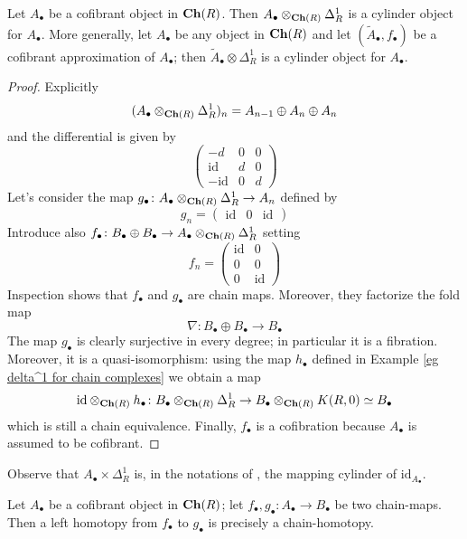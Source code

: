 \begin{refsection}
\begin{lemma}
Let $A_\bullet$ be a cofibrant object in $\mathbf{Ch}(R)$. Then $A_\bullet \otimes_{\mathbf{Ch}(R)} \Delta^1_R$ is a cylinder object for $A_\bullet$. More generally, let $A_\bullet$ be any object in $\mathbf{Ch}(R)$ and let $(\widetilde{A}_\bullet,f_\bullet)$ be a cofibrant approximation of $A_\bullet$; then $\widetilde{A}_\bullet \otimes \Delta^1_R$ is a cylinder object for $A_\bullet$.
\end{lemma}

\begin{proof}
Explicitly
\[
(A_\bullet \otimes_{\mathbf{Ch}(R)} \Delta^1_R)_n = A_{n-1} \oplus A_n \oplus A_n
\]
and the differential is given by
\[
\begin{pmatrix}
- d & 0 & 0 \\ \mathrm{id} & d & 0 \\ - \mathrm{id} & 0 & d
\end{pmatrix}
\]
Let's consider the map $g_\bullet \colon A_\bullet \otimes_{\mathbf{Ch}(R)} \Delta^1_R \to A_n$ defined by
\[
g_n = \begin{pmatrix} \mathrm{id} & 0 & \mathrm{id} \end{pmatrix}
\]
Introduce also $f_\bullet \colon B_\bullet \oplus B_\bullet \to A_\bullet \otimes_{\mathbf{Ch}(R)} \Delta^1_R$ setting
\[
f_n = \begin{pmatrix} \mathrm{id} & 0 \\ 0 & 0 \\ 0 & \mathrm{id} \end{pmatrix}
\]
Inspection shows that $f_\bullet$ and $g_\bullet$ are chain maps. Moreover, they factorize the fold map
\[
\nabla \colon B_\bullet \oplus B_\bullet \to B_\bullet
\]
The map $g_\bullet$ is clearly surjective in every degree; in particular it is a fibration. Moreover, it is a quasi-isomorphism: using the map $h_\bullet$ defined in Example \ref{eg delta^1 for chain complexes} we obtain a map
\[
\mathrm{id} \otimes_{\mathbf{Ch}(R)} h_\bullet \colon B_\bullet \otimes_{\mathbf{Ch}(R)} \Delta^1_R \to B_\bullet \otimes_{\mathbf{Ch}(R)} K(R,0) \simeq B_\bullet
\]
which is still a chain equivalence. Finally, $f_\bullet$ is a cofibration because $A_\bullet$ is assumed to be cofibrant.
\end{proof}

\begin{rmk}
Observe that $A_\bullet \times \Delta^1_R$ is, in the notations of \cite[Ch. 1.5]{weibel}, the mapping cylinder of $\mathrm{id}_{A_\bullet}$.
\end{rmk}

\begin{cor}
Let $A_\bullet$ be a cofibrant object in $\mathbf{Ch}(R)$; let $f_\bullet, g_\bullet \colon A_\bullet \to B_\bullet$ be two chain-maps. Then a left homotopy from $f_\bullet$ to $g_\bullet$ is precisely a chain-homotopy.
\end{cor}


\end{refsection}
